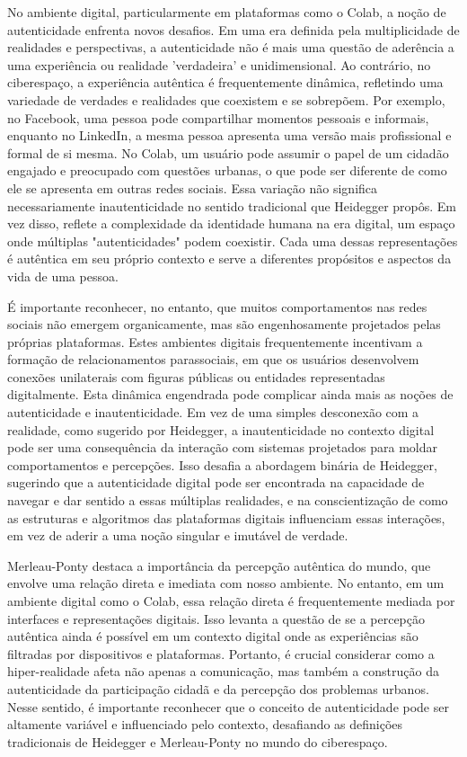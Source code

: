 No ambiente digital, particularmente em plataformas como o Colab, a noção de autenticidade enfrenta novos desafios. Em uma era definida pela multiplicidade de realidades e perspectivas, a autenticidade não é mais uma questão de aderência a uma experiência ou realidade 'verdadeira' e unidimensional. Ao contrário, no ciberespaço, a experiência autêntica é frequentemente dinâmica, refletindo uma variedade de verdades e realidades que coexistem e se sobrepõem. Por exemplo, no Facebook, uma pessoa pode compartilhar momentos pessoais e informais, enquanto no LinkedIn, a mesma pessoa apresenta uma versão mais profissional e formal de si mesma. No Colab, um usuário pode assumir o papel de um cidadão engajado e preocupado com questões urbanas, o que pode ser diferente de como ele se apresenta em outras redes sociais. Essa variação não significa necessariamente inautenticidade no sentido tradicional que Heidegger propôs. Em vez disso, reflete a complexidade da identidade humana na era digital, um espaço onde múltiplas "autenticidades" podem coexistir. Cada uma dessas representações é autêntica em seu próprio contexto e serve a diferentes propósitos e aspectos da vida de uma pessoa.

É importante reconhecer, no entanto, que muitos comportamentos nas redes sociais não emergem organicamente, mas são engenhosamente projetados pelas próprias plataformas. Estes ambientes digitais frequentemente incentivam a formação de relacionamentos parassociais, em que os usuários desenvolvem conexões unilaterais com figuras públicas ou entidades representadas digitalmente. Esta dinâmica engendrada pode complicar ainda mais as noções de autenticidade e inautenticidade. Em vez de uma simples desconexão com a realidade, como sugerido por Heidegger, a inautenticidade no contexto digital pode ser uma consequência da interação com sistemas projetados para moldar comportamentos e percepções. Isso desafia a abordagem binária de Heidegger, sugerindo que a autenticidade digital pode ser encontrada na capacidade de navegar e dar sentido a essas múltiplas realidades, e na conscientização de como as estruturas e algoritmos das plataformas digitais influenciam essas interações, em vez de aderir a uma noção singular e imutável de verdade.

Merleau-Ponty destaca a importância da percepção autêntica do mundo, que envolve uma relação direta e imediata com nosso ambiente. No entanto, em um ambiente digital como o Colab, essa relação direta é frequentemente mediada por interfaces e representações digitais. Isso levanta a questão de se a percepção autêntica ainda é possível em um contexto digital onde as experiências são filtradas por dispositivos e plataformas. Portanto, é crucial considerar como a hiper-realidade afeta não apenas a comunicação, mas também a construção da autenticidade da participação cidadã e da percepção dos problemas urbanos. Nesse sentido, é importante reconhecer que o conceito de autenticidade pode ser altamente variável e influenciado pelo contexto, desafiando as definições tradicionais de Heidegger e Merleau-Ponty no mundo do ciberespaço.

